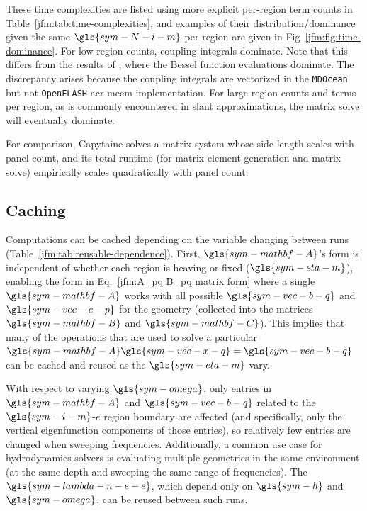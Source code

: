 \documentclass[ASNA,twocolumn]{USG} %
\begin{document}
These time complexities are listed using more explicit per-region term counts in Table~\ref{jfm:tab:time-complexities}, and examples of their distribution/dominance given the same $\gls{sym-N-i-m}$ per region are given in Fig~\ref{jfm:fig:time-dominance}.
For low region counts, coupling integrals dominate.
\ifdefined\DISSERTATION
Note that this differs from the results of , where the Bessel function evaluations dominate.
The discrepancy arises because the coupling integrals are vectorized in the \texttt{MDOcean} but not \texttt{OpenFLASH} \gls{acr-meem} implementation.
\fi
For large region counts and terms per region, as is commonly encountered in slant approximations, the matrix solve will eventually dominate.

For comparison, Capytaine solves a matrix system whose side length scales with panel count, and its total runtime (for matrix element generation and matrix solve) empirically scales quadratically with panel count.

\subsection{Caching}
Computations can be cached depending on the variable changing between runs (Table~\ref{jfm:tab:reusable-dependence}).
First, $\gls{sym-mathbf-A}$'s form is independent of whether each region is heaving or fixed ($\gls{sym-eta-m}$), enabling the form in Eq.~\ref{jfm:A_pq B_pq matrix form} where a single $\gls{sym-mathbf-A}$ works with all possible $\gls{sym-vec-b-q}$ and $\gls{sym-vec-c-p}$ for the geometry (collected into the matrices $\gls{sym-mathbf-B}$ and $\gls{sym-mathbf-C}$). This implies that many of the operations that are used to solve a particular $\gls{sym-mathbf-A}\gls{sym-vec-x-q} = \gls{sym-vec-b-q}$ can be cached and reused as the $\gls{sym-eta-m}$ vary.

With respect to varying $\gls{sym-omega}$, only entries in $\gls{sym-mathbf-A}$ and $\gls{sym-vec-b-q}$ related to the $\gls{sym-i-m}$-$e$ region boundary are affected (and specifically, only the vertical eigenfunction components of those entries), so relatively few entries are changed when sweeping frequencies.
Additionally, a common use case for hydrodynamics solvers is evaluating multiple geometries in the same environment (at the same depth and sweeping the same range of frequencies).
The $\gls{sym-lambda-n-e-e}$, which depend only on $\gls{sym-h}$ and $\gls{sym-omega}$, can be reused between such runs.
\end{document}
